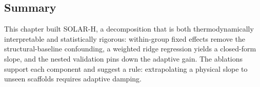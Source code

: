 \subsection{Summary}

This chapter built SOLAR-H, a decomposition that is both thermodynamically interpretable and statistically rigorous: within-group fixed effects remove the structural-baseline confounding, a weighted ridge regression yields a closed-form slope, and the nested validation pins down the adaptive gain. The ablations support each component and suggest a rule: extrapolating a physical slope to unseen scaffolds requires adaptive damping.
